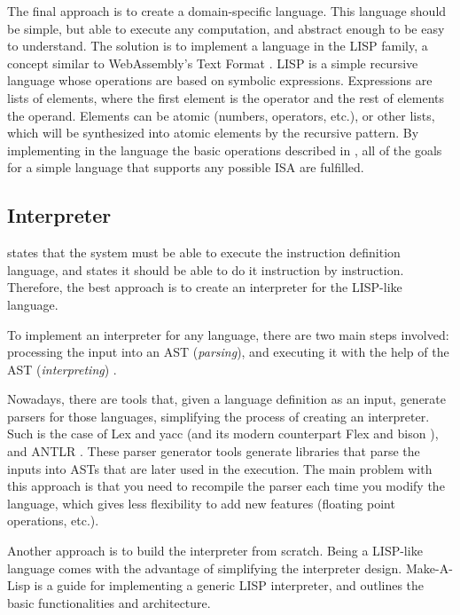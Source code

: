 The final approach is to create a domain-specific language. This language should be simple, but able to execute any computation, and abstract enough to be easy to understand. The solution is to implement a language in the LISP family, a concept similar to WebAssembly's Text Format \parencite{wasmtext}. LISP \parencite{mccarthy1960recursive} is a simple recursive language whose operations are based on symbolic expressions. Expressions are lists of elements, where the first element is the operator and the rest of elements the operand. Elements can be atomic (numbers, operators, etc.), or other lists, which will be synthesized into atomic elements by the recursive pattern. By implementing in the language the basic operations described in , all of the goals for a simple language that supports any possible \gls{ISA} are fulfilled.


\subsection{Interpreter}\label{subsec:interpreter-study}
 states that the system must be able to execute the \gls{instruction} definition language, and  states it should be able to do it \gls{instruction} by instruction. Therefore, the best approach is to create an \gls{interpreter} for the LISP-like language.

To implement an \gls{interpreter} for any language, there are two main steps involved: processing the input into an \gls{AST} (\textit{parsing}), and executing it with the help of the \gls{AST} (\textit{interpreting}) \parencite{mogensen2009basics}.

Nowadays, there are tools that, given a language definition as an input, generate parsers for those languages, simplifying the process of creating an \gls{interpreter}. Such is the case of Lex and yacc \parencite{LevineJohnR1992Ly} (and its modern counterpart Flex and bison \parencite{LevineJohnR2009Fb}), and ANTLR \parencite{ParrTerenceTerenceJohn2010Lip}%
. These parser generator tools generate libraries that parse the inputs into \glspl{AST} that are later used in the execution. The main problem with this approach is that you need to recompile the parser each time you modify the language, which gives less flexibility to add new features (floating point operations, etc.).

Another approach is to build the \gls{interpreter} from scratch. Being a LISP-like language comes with the advantage of simplifying the \gls{interpreter} design. Make-A-Lisp \parencite{mal} is a guide for implementing a generic LISP \gls{interpreter}, and outlines the basic functionalities and architecture.


